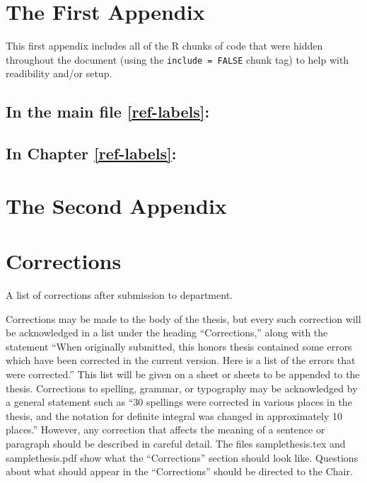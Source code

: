 \documentclass[12pt, twoside]{amherstthesis}
\begin{document}
\appendix

\hypertarget{the-first-appendix}{%
\chapter{The First Appendix}\label{the-first-appendix}}

This first appendix includes all of the R chunks of code that were hidden throughout the document (using the \texttt{include\ =\ FALSE} chunk tag) to help with readibility and/or setup.

\hypertarget{in-the-main-file-refref-labels}{%
\section{In the main file \ref{ref-labels}:}\label{in-the-main-file-refref-labels}}

\hypertarget{in-chapter-refref-labels}{%
\section{In Chapter \ref{ref-labels}:}\label{in-chapter-refref-labels}}

\hypertarget{the-second-appendix}{%
\chapter{The Second Appendix}\label{the-second-appendix}}

\hypertarget{corrections}{%
\chapter*{Corrections}\label{corrections}}

A list of corrections after submission to department.

Corrections may be made to the body of the thesis, but every such correction will be acknowledged in a list under the heading ``Corrections,'' along with the statement ``When originally submitted, this honors thesis contained some errors which have been corrected in the current version. Here is a list of the errors that were corrected.'' This list will be given on a sheet or sheets to be appended to the thesis. Corrections to spelling, grammar, or typography may be acknowledged by a general statement such as ``30 spellings were corrected in various places in the thesis, and the notation for definite integral was changed in approximately 10 places.'' However, any correction that affects the meaning of a sentence or paragraph should be described in careful detail. The files samplethesis.tex and samplethesis.pdf show what the ``Corrections'' section should look like. Questions about what should appear in the ``Corrections'' should be directed to the Chair.
\end{document}
